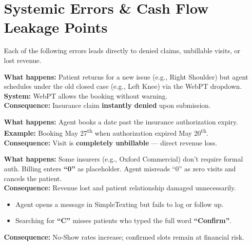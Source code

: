 \documentclass[11pt,a4paper]{article}
\begin{document}
\newpage
\section{Systemic Errors \& Cash Flow Leakage Points}

Each of the following errors leads directly to denied claims, unbillable visits, or lost revenue.

\vspace{0.3em}

\begin{tcolorbox}[dangerbox,title={Error \#1 --- Multiple Cases Scheduling (Critical Billing Failure)}]
\textbf{What happens:} Patient returns for a new issue (e.g., Right Shoulder) but agent schedules under the old closed case (e.g., Left Knee) via the WebPT dropdown.\\[0.3em]
\textbf{System:} WebPT allows the booking without warning.\\[0.3em]
\textbf{Consequence:} Insurance claim \textbf{instantly denied} upon submission.
\end{tcolorbox}

\begin{tcolorbox}[dangerbox,title={Error \#2 --- Expired Authorization Scheduling}]
\textbf{What happens:} Agent books a date past the insurance authorization expiry.\\[0.3em]
\textbf{Example:} Booking May 27\textsuperscript{th} when authorization expired May 20\textsuperscript{th}.\\[0.3em]
\textbf{Consequence:} Visit is \textbf{completely unbillable} --- direct revenue loss.
\end{tcolorbox}

\begin{tcolorbox}[warnbox,title={Error \#3 --- Dummy Authorization Misinterpretation}]
\textbf{What happens:} Some insurers (e.g., Oxford Commercial) don't require formal auth. Billing enters \textbf{``0''} as placeholder. Agent misreads ``0'' as zero visits and cancels the patient.\\[0.3em]
\textbf{Consequence:} Revenue lost and patient relationship damaged unnecessarily.
\end{tcolorbox}

\begin{tcolorbox}[warnbox,title={Error \#4 --- SMS Leakage \& Response Processing Failures}]
\begin{itemize}
  \item Agent opens a message in SimpleTexting but fails to log or follow up.
  \item Searching for \textbf{``C''} misses patients who typed the full word \textbf{``Confirm''}.
\end{itemize}
\textbf{Consequence:} No-Show rates increase; confirmed slots remain at financial risk.
\end{tcolorbox}
\end{document}
